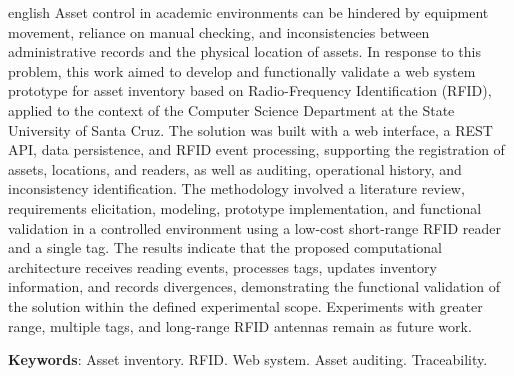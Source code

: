\begin{resumo}[Abstract]
 \begin{otherlanguage*}{english}
Asset control in academic environments can be hindered by equipment movement, reliance on manual checking, and inconsistencies between administrative records and the physical location of assets. In response to this problem, this work aimed to develop and functionally validate a web system prototype for asset inventory based on Radio-Frequency Identification (RFID), applied to the context of the Computer Science Department at the State University of Santa Cruz. The solution was built with a web interface, a REST API, data persistence, and RFID event processing, supporting the registration of assets, locations, and readers, as well as auditing, operational history, and inconsistency identification. The methodology involved a literature review, requirements elicitation, modeling, prototype implementation, and functional validation in a controlled environment using a low-cost short-range RFID reader and a single tag. The results indicate that the proposed computational architecture receives reading events, processes tags, updates inventory information, and records divergences, demonstrating the functional validation of the solution within the defined experimental scope. Experiments with greater range, multiple tags, and long-range RFID antennas remain as future work.

   \vspace{\onelineskip}
 
   \noindent 
   \textbf{Keywords}: Asset inventory. RFID. Web system. Asset auditing. Traceability.
 \end{otherlanguage*}
\end{resumo}

